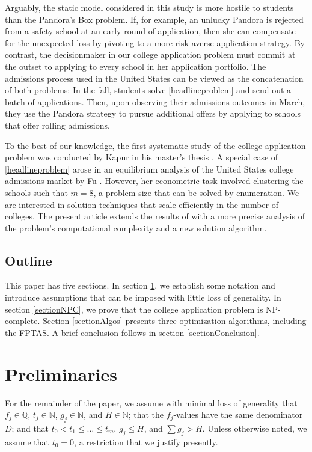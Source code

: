 Arguably, the static model considered in this study is more hostile to students than the Pandora's Box problem. If, for example, an unlucky Pandora is rejected from a safety school at an early round of application, then she can compensate for the unexpected loss by pivoting to a more risk-averse application strategy. By contrast, the decisionmaker in our college application problem must commit at the outset to applying to every school in her application portfolio. The admissions process used in the United States can be viewed as the concatenation of both problems: In the fall, students solve \eqref{headlineproblem} and send out a batch of applications. Then, upon observing their admissions outcomes in March, they use the Pandora strategy to pursue additional offers by applying to schools that offer rolling admissions.

To the best of our knowledge, the first systematic study of the college application problem was conducted by Kapur in his master's thesis \cite{kapur2022}. A special case of \eqref{headlineproblem} arose in an equilibrium analysis of the United States college admissions market by Fu \cite{fu2014}. However, her econometric task involved clustering the schools such that $m=8$, a problem size that can be solved by enumeration. We are interested in solution techniques that scale efficiently in the number of colleges. The present article extends the results of \cite{kapur2022} with a more precise analysis of the problem's computational complexity and a new solution algorithm.

\subsection{Outline}

This paper has five sections. In section \ref{sectionPrelims}, we establish some notation and introduce assumptions that can be imposed with little loss of generality. In section \ref{sectionNPC}, we prove that the college application problem is NP-complete. Section \ref{sectionAlgos} presents three optimization algorithms, including the FPTAS. A brief conclusion follows in section \ref{sectionConclusion}.

\section{Preliminaries} \label{sectionPrelims}

For the remainder of the paper, we assume with minimal loss of generality that $f_j \in \mathbb{Q}$, $t_j \in \mathbb{N}$, $g_j \in \mathbb{N}$, and $H \in \mathbb{N}$; that the $f_j$-values have the same denominator $D$; and that $t_0 < t_1 \leq \dots \leq t_m$, $g_j \leq H$, and $\sum g_j > H$. Unless otherwise noted, we assume that $t_0 = 0$, a restriction that we justify presently.

